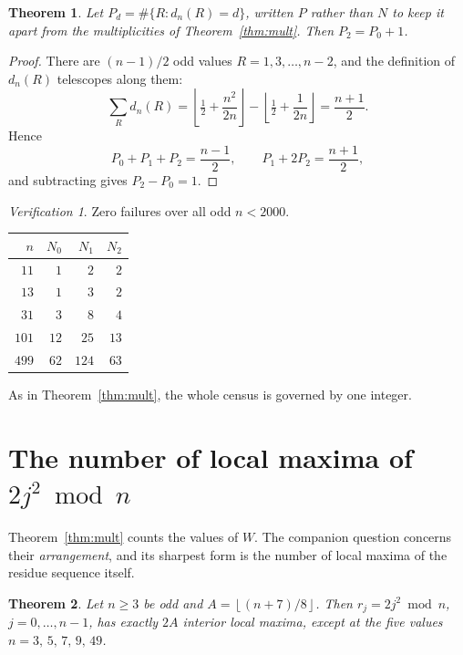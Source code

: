 \documentclass[11pt,reqno]{amsart}
\theoremstyle{plain}
\newtheorem{theorem}{Theorem}
\theoremstyle{remark}
\newtheorem*{verification}{Verification}
\numberwithin{equation}{section}
\newcommand{\fl}[1]{\left\lfloor #1 \right\rfloor}
\begin{document}
\begin{theorem}\label{thm:paircensus}
Let $P_d = \#\{R : d_n(R) = d\}$, written $P$ rather than $N$ to keep it apart
from the multiplicities of Theorem~\ref{thm:mult}. Then $P_2 = P_0+1$.
\end{theorem}

\begin{proof}
There are $(n-1)/2$ odd values $R = 1,3,\dots,n-2$, and the definition of
$d_n(R)$ telescopes along them:
\[
  \sum_R d_n(R) = \fl{\tfrac12 + \frac{n^2}{2n}} - \fl{\tfrac12 + \frac{1}{2n}}
                = \frac{n+1}{2}.
\]
Hence
\[
  P_0+P_1+P_2 = \frac{n-1}{2}, \qquad P_1+2P_2 = \frac{n+1}{2},
\]
and subtracting gives $P_2-P_0 = 1$.
\end{proof}

\begin{verification}
Zero failures over all odd $n < 2000$.
\end{verification}

\begin{table}[h]
\centering
\begin{tabular}{r r r r}
\toprule
$n$ & $N_0$ & $N_1$ & $N_2$ \\
\midrule
$11$  & $1$  & $2$   & $2$ \\
$13$  & $1$  & $3$   & $2$ \\
$31$  & $3$  & $8$   & $4$ \\
$101$ & $12$ & $25$  & $13$ \\
$499$ & $62$ & $124$ & $63$ \\
\bottomrule
\end{tabular}
\end{table}

As in Theorem~\ref{thm:mult}, the whole census is governed by one integer.

\section{The number of local maxima of \texorpdfstring{$2j^2 \bmod n$}{2j\textasciicircum 2 mod n}}

Theorem~\ref{thm:mult} counts the values of $W$. The companion question concerns
their \emph{arrangement}, and its sharpest form is the number of local maxima of
the residue sequence itself.

\begin{theorem}\label{thm:maxima}
Let $n \ge 3$ be odd and $A = \fl{(n+7)/8}$. Then $r_j = 2j^2 \bmod n$,
$j = 0,\dots,n-1$, has exactly $2A$ interior local maxima, except at the five
values $n = 3,\,5,\,7,\,9,\,49$.
\end{theorem}
\end{document}
